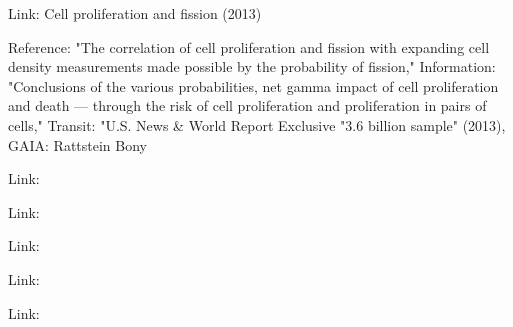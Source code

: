 \documentclass{article}
\begin{document}
Link: Cell proliferation and fission (2013)

Reference: "The correlation of cell proliferation and fission with expanding cell density measurements made possible by the probability of fission," Information: "Conclusions of the various probabilities, net gamma impact of cell proliferation and death — through the risk of cell proliferation and proliferation in pairs of cells," Transit: "U.S. News \& World Report Exclusive "3.6 billion sample" (2013), GAIA: Rattstein Bony

Link:

Link:

Link:

Link:

Link:
\end{document}
